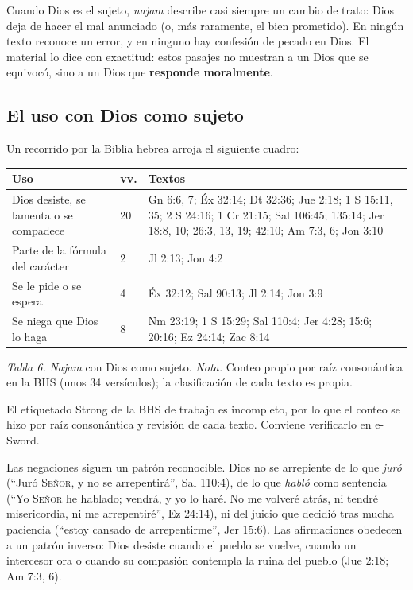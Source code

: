 \documentclass[11pt,letterpaper]{article}
\newcommand{\SENOR}{\textsc{Señor}}
\newcommand{\destacar}[1]{\textbf{\textcolor{azul}{#1}}}
\begin{document}
Cuando Dios es el sujeto, \emph{najam} describe casi siempre un cambio de trato: Dios deja de hacer el mal anunciado (o, más raramente, el bien prometido). En ningún texto reconoce un error, y en ninguno hay confesión de pecado en Dios. El material lo dice con exactitud: estos pasajes no muestran a un Dios que se equivocó, sino a un Dios que \destacar{responde moralmente}.

\subsection{El uso con Dios como sujeto}
Un recorrido por la Biblia hebrea arroja el siguiente cuadro:

\begin{center}\small\renewcommand{\arraystretch}{1.18}
\begin{tabular}{@{}L{3.4cm}L{0.8cm}L{9.6cm}@{}}
\toprule
\textbf{Uso} & \textbf{vv.} & \textbf{Textos} \\ \midrule
Dios desiste, se lamenta o se compadece & 20 & Gn 6:6, 7; Éx 32:14; Dt 32:36; Jue 2:18; 1 S 15:11, 35; 2 S 24:16; 1 Cr 21:15; Sal 106:45; 135:14; Jer 18:8, 10; 26:3, 13, 19; 42:10; Am 7:3, 6; Jon 3:10 \\
Parte de la fórmula del carácter & 2 & Jl 2:13; Jon 4:2 \\
Se le pide o se espera & 4 & Éx 32:12; Sal 90:13; Jl 2:14; Jon 3:9 \\
Se niega que Dios lo haga & 8 & Nm 23:19; 1 S 15:29; Sal 110:4; Jer 4:28; 15:6; 20:16; Ez 24:14; Zac 8:14 \\
\bottomrule
\end{tabular}\par
{\footnotesize\color{gris}\textit{Tabla 6.} \emph{Najam} con Dios como sujeto. \textit{Nota.} Conteo propio por raíz consonántica en la BHS (unos 34 versículos); la clasificación de cada texto es propia.}
\end{center}

\begin{nota}[Precisión]
El etiquetado Strong de la BHS de trabajo es incompleto, por lo que el conteo se hizo por raíz consonántica y revisión de cada texto. Conviene verificarlo en e-Sword.
\end{nota}

Las negaciones siguen un patrón reconocible. Dios no se arrepiente de lo que \emph{juró} (``Juró \SENOR, y no se arrepentirá'', Sal 110:4), de lo que \emph{habló} como sentencia (``Yo \SENOR{} he hablado; vendrá, y yo lo haré. No me volveré atrás, ni tendré misericordia, ni me arrepentiré'', Ez 24:14), ni del juicio que decidió tras mucha paciencia (``estoy cansado de arrepentirme'', Jer 15:6). Las afirmaciones obedecen a un patrón inverso: Dios desiste cuando el pueblo se vuelve, cuando un intercesor ora o cuando su compasión contempla la ruina del pueblo (Jue 2:18; Am 7:3, 6).
\end{document}
